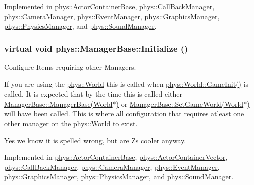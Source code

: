 Implemented in \hyperlink{classphys_1_1ActorContainerBase_aa86380fd1b18d660f68b60f075967cf8}{phys::ActorContainerBase}, \hyperlink{classphys_1_1CallBackManager_aa0568dd5c2d1bb6dc669dfa2ca3486ad}{phys::CallBackManager}, \hyperlink{classphys_1_1CameraManager_a8412ea634307aa280b615a3cc7c9b739}{phys::CameraManager}, \hyperlink{classphys_1_1EventManager_a194890f7f8be5d45aa98623481482696}{phys::EventManager}, \hyperlink{classphys_1_1GraphicsManager_abf48faad2e09cd564442e66bc0473e58}{phys::GraphicsManager}, \hyperlink{classphys_1_1PhysicsManager_a4d151cd24052ef3cccde6b66b8745be6}{phys::PhysicsManager}, and \hyperlink{classphys_1_1SoundManager_a6815f78a6170b119e2d1d24e862ffbf8}{phys::SoundManager}.

\hypertarget{classphys_1_1ManagerBase_a57dd8e54e767427d5bdcc86dc66d73ed}{
\subsubsection[{Initialize}]{\setlength{\rightskip}{0pt plus 5cm}virtual void phys::ManagerBase::Initialize ()}}
\label{d2/de3/classphys_1_1ManagerBase_a57dd8e54e767427d5bdcc86dc66d73ed}


Configure Items requiring other Managers. 

If you are using the \hyperlink{classphys_1_1World}{phys::World} this is called when \hyperlink{classphys_1_1World_a21cc36be08a61f40619584d4c438936b}{phys::World::GameInit()} is called. It is expected that by the time this is called either \hyperlink{classphys_1_1ManagerBase_ab9ad12416f771d95fe8a6d953923c634}{ManagerBase::ManagerBase(World$\ast$)} or \hyperlink{classphys_1_1ManagerBase_a97eb1e77c1f7a0925fc623836368a262}{ManagerBase::SetGameWorld(World$\ast$)} will have been called. This is where all configuration that requires atleast one other manager on the \hyperlink{classphys_1_1World}{phys::World} to exist.\par
\par
 Yes we know it is spelled wrong, but are Zs cooler anyway. 

Implemented in \hyperlink{classphys_1_1ActorContainerBase_af36d5866e0ee9f6f450a4e62642e0928}{phys::ActorContainerBase}, \hyperlink{classphys_1_1ActorContainerVector_adcebf4329a587669f74e1eacc1e6912c}{phys::ActorContainerVector}, \hyperlink{classphys_1_1CallBackManager_a3d2af4e3c947b14f628c3e09a96af2f9}{phys::CallBackManager}, \hyperlink{classphys_1_1CameraManager_a5e956b61fa341ae576d8d160da518488}{phys::CameraManager}, \hyperlink{classphys_1_1EventManager_a51afdd83f44f461dfac5c9eca5883ea0}{phys::EventManager}, \hyperlink{classphys_1_1GraphicsManager_a554572de5d1cdce37aa1760d6e6e039c}{phys::GraphicsManager}, \hyperlink{classphys_1_1PhysicsManager_a28885be750bb763d957f122593815388}{phys::PhysicsManager}, and \hyperlink{classphys_1_1SoundManager_ae6d3957f965b54e06ec540e903cec68d}{phys::SoundManager}.

